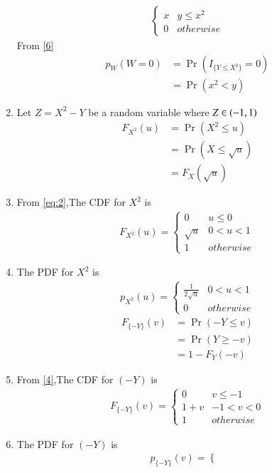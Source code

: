 \documentclass[journal,12pt,twocolumn]{IEEEtran}
\begin{document}
\begin{enumerate}
\begin{align}
\begin{cases}
    x & y \leq x^2 \\
    0 & otherwise
\end{cases}  \label{6}
\end{align}
From \eqref{6}
\begin{align}
p_W(W=0) &= \Pr(I_{\{Y\leq X^2\}}=0) \\
         &=\Pr(x^2 <y) \label{7}
\end{align}
\item Let $Z=X^2-Y$ be a random variable where $Z \in \left(-1,1\right)$
\begin{align}
F_{X^2}(u)&=\Pr(X^2 \leq u) \\
          &=\Pr(X \leq \sqrt{u}) \\
          &=F_X(\sqrt{u}) \label{8}
\end{align}
\item From \eqref{eq:2},The CDF for $X^2$ is
\begin{align}
F_{X^2}(u)  = 
\begin{cases}
      0 & u \leq 0 \\
      \sqrt{u} & 0 < u < 1 \\
      1 & otherwise
\end{cases} \label{9}
\end{align}
\item The PDF for $X^2$ is
\begin{align}
p_{X^2}(u)  = 
\begin{cases}
      \frac{1}{2\sqrt{u}} & 0 < u < 1 \\
      0 & otherwise
\end{cases} \label{10}
\end{align}
\begin{align}
F_{\{-Y\}}(v)&=\Pr(-Y \leq v) \\
          &=\Pr(Y \geq -v) \\
          &=1-F_Y(-v) \label{11}
\end{align}
\item From \eqref{4},The CDF for $(-Y)$ is
\begin{align}
F_{\{-Y\}}(v)  = 
\begin{cases}
      0 & v \leq -1\\
      1+v & -1 < v < 0 \\
      1 & otherwise 
\end{cases}\label{12}
\end{align}
\item The PDF for $(-Y)$ is
\begin{align}
p_{\{-Y\}}(v)  = 
\begin{cases}

\end{cases}
\end{align}
\end{enumerate}
\end{document}
